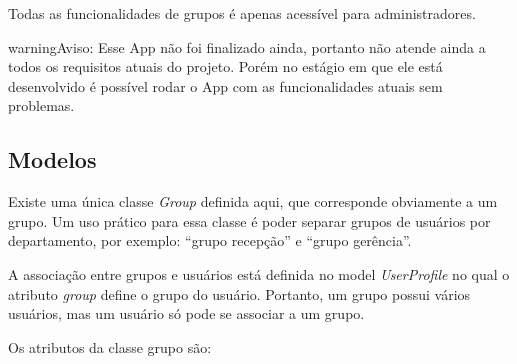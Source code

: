\documentclass[letterpaper,10pt,brazil]{sphinxmanual}
\begin{document}
Todas as funcionalidades de grupos é apenas acessível para administradores.

\begin{notice}{warning}{Aviso:}
Esse App não foi finalizado ainda, portanto não atende ainda a todos os requisitos atuais do projeto. Porém no estágio em que ele está desenvolvido é possível rodar o App com as funcionalidades atuais sem problemas.
\end{notice}


\subsection{Modelos}
\label{apps/groups:modelos}\label{apps/groups:module-groups.models}
Existe uma única classe \emph{Group} definida aqui, que corresponde obviamente a um grupo. Um uso prático para essa classe é poder separar grupos de usuários por departamento, por exemplo: ``grupo recepção'' e ``grupo gerência''.

A associação entre grupos e usuários está definida no model \emph{UserProfile} no qual o atributo \emph{group} define o grupo do usuário. Portanto, um grupo possui vários usuários, mas um usuário só pode se associar a um grupo.

Os atributos da classe grupo são:
\end{document}
